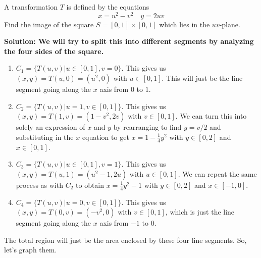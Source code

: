\begin{example} \label{exsquare}
    A transformation $T$ is defined by the equations
    \[ x = u^2-v^2 \quad y = 2uv\]
    Find the image of the square $S = [0, 1]\times[0, 1]$ which lies in the $uv$-plane. \par
    \bf{Solution: }We will try to split this into different segments by analyzing the four sides of the square. 
    \begin{enumerate}
        \item $C_1 = \{T(u, v)|u\in[0,1], v=0\}$. This gives us $(x,y) = T(u, 0) = (u^2, 0)$ with $u\in[0,1]$. This will just be the line segment going along the $x$ axis from $0$ to $1$.
        \item $C_2 = \{T(u,v)|u=1, v\in[0, 1]\}$. This gives us 
        $(x,y) = T(1, v) = (1-v^2, 2v)$ with $v\in[0,1]$. We can turn this into solely an expression of $x$ and $y$ by rearranging to find $y = v/2$ and substituting in the $x$ equation to get $x = 1-\frac{1}{4}y^2$ with $y\in[0,2]$ and $x\in[0,1]$. 
        \item $C_3 = \{T(u,v)|u\in[0,1], v=1\}$. This gives us $(x,y) = T(u, 1) = (u^2-1, 2u)$ with $u\in[0,1]$. We can repeat the same process as with $C_2$ to obtain $x = \frac{1}{4}y^2-1$ with $y\in[0, 2]$ and $x\in[-1, 0]$. 
        \item $C_4 = \{T(u,v)|u=0, v\in[0,1]\}$. This gives us $(x,y) = T(0, v) = (-v^2, 0)$ with $v\in[0,1]$, which is just the line segment going along the $x$ axis from $-1$ to $0$.
    \end{enumerate}
    The total region will just be the area enclosed by these four line segments. So, let's graph them.
        \begin{figure}[h!]
        \centering
    \end{figure}
\end{example}
